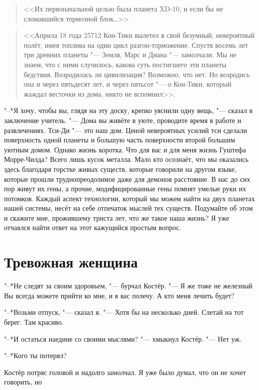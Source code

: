 \begin{quote}
<<Их первоначальной целью была планета XD-10, и если бы не сломавшийся тормозной блок\ldots>>
\end{quote}

\begin{quote}
<<\ldotst Априла 18 года 25712 Кон-Тики вылетел в свой безумный, невероятный полёт, имея топлива на один цикл разгон-торможение.
Спустя восемь лет три древних планеты "--- Земля, Марс и Диана "--- замолчали.
Мы не знаем, что с ними случилось, какова суть постигшего эти планеты бедствия.
Возродилась ли цивилизация?
Возможно, что нет.
Но возродись она и через пятьдесят лет, и через пятьсот "--- о Кон-Тики, который жаждал весточки из дома, никто не вспомнил>>.
\end{quote}

"--*Я хочу, чтобы вы, глядя на эту доску, крепко уяснили одну вещь, "--- сказал в заключение учитель.
"--- Дома вы живёте в уюте, проводите время в работе и развлечениях.
Тси-Ди "--- это наш дом.
Ценой невероятных усилий тси сделали поверхность одной планеты и большую часть поверхности второй большим уютным домом.
Однако жизнь коротка.
Что для вас и для меня жизнь Гуштефа Морре-Чилда?
Всего лишь кусок металла.
Мало кто осознаёт, что мы оказались здесь благодаря горстке живых существ, которые говорили на другом языке, которые прошли труднопреодолимое даже для демонов расстояние.
В нас до сих пор живут их гены, а прочие, модифицированные гены помнят умелые руки их потомков.
Каждый аспект технологии, который мы можем найти на двух планетах нашей системы, несёт на себе отпечаток мыслей тех существ.
Подумайте об этом и скажите мне, прожившему триста лет, что же такое наша жизнь?
Я уже отчаялся найти ответ на этот кажущийся простым вопрос.

\section{Тревожная женщина}

"--*Не следят за своим здоровьем, "--- бурчал Костёр.
"--- Я же тоже не железный\ldotst
Вы всегда можете прийти ко мне, и я вас полечу.
А кто меня лечить будет?

"--*Возьми отпуск, "--- сказал я.
"--- Хотя бы на несколько дней.
Слетай на тот берег.
Там красиво.

"--*И остаться наедине со своими мыслями? "--- хмыкнул Костёр.
"--- Нет уж.

"--*Кого ты потерял?

Костёр потряс головой и надолго замолчал.
Я уже было думал, что он не хочет говорить, но\ldotst

